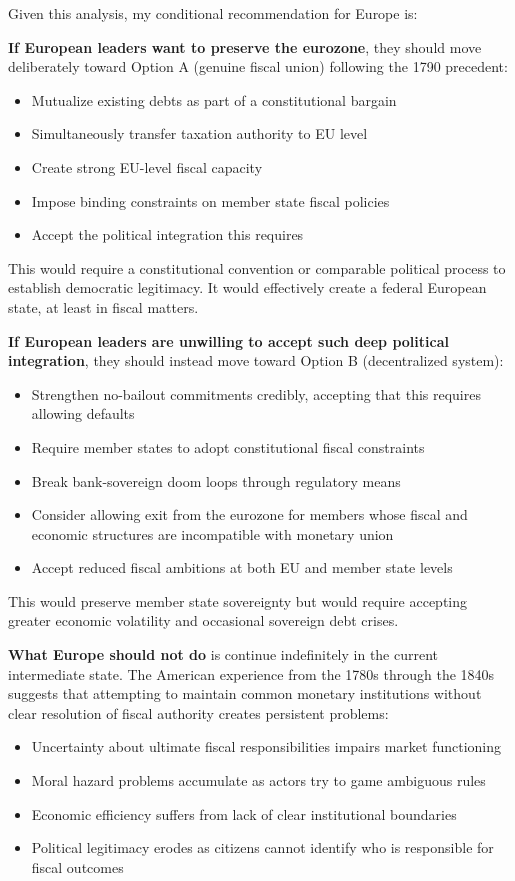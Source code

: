 \documentclass[12pt]{article}
\begin{document}
Given this analysis, my conditional recommendation for Europe is:

\textbf{If European leaders want to preserve the eurozone}, they should move deliberately toward Option A (genuine fiscal union) following the 1790 precedent:
\begin{itemize}
\item Mutualize existing debts as part of a constitutional bargain
\item Simultaneously transfer taxation authority to EU level
\item Create strong EU-level fiscal capacity
\item Impose binding constraints on member state fiscal policies
\item Accept the political integration this requires
\end{itemize}

This would require a constitutional convention or comparable political process to establish democratic legitimacy. It would effectively create a federal European state, at least in fiscal matters.

\textbf{If European leaders are unwilling to accept such deep political integration}, they should instead move toward Option B (decentralized system):
\begin{itemize}
\item Strengthen no-bailout commitments credibly, accepting that this requires allowing defaults
\item Require member states to adopt constitutional fiscal constraints
\item Break bank-sovereign doom loops through regulatory means
\item Consider allowing exit from the eurozone for members whose fiscal and economic structures are incompatible with monetary union
\item Accept reduced fiscal ambitions at both EU and member state levels
\end{itemize}

This would preserve member state sovereignty but would require accepting greater economic volatility and occasional sovereign debt crises.

\textbf{What Europe should not do} is continue indefinitely in the current intermediate state. The American experience from the 1780s through the 1840s suggests that attempting to maintain common monetary institutions without clear resolution of fiscal authority creates persistent problems:
\begin{itemize}
\item Uncertainty about ultimate fiscal responsibilities impairs market functioning
\item Moral hazard problems accumulate as actors try to game ambiguous rules
\item Economic efficiency suffers from lack of clear institutional boundaries
\item Political legitimacy erodes as citizens cannot identify who is responsible for fiscal outcomes
\end{itemize}
\end{document}

